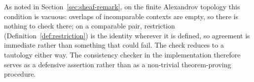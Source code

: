 As noted in Section~\ref{sec:sheaf-remark}, on the finite Alexandrov topology
this condition is vacuous: overlaps of incomparable contexts are empty, so
there is nothing to check there; on a comparable pair, restriction
(Definition~\ref{def:restriction}) is the identity wherever it is defined,
so agreement is immediate rather than something that could fail. The check
reduces to a tautology either way. The consistency checker in the implementation
therefore serves as a defensive assertion rather than as a non-trivial
theorem-proving procedure.

